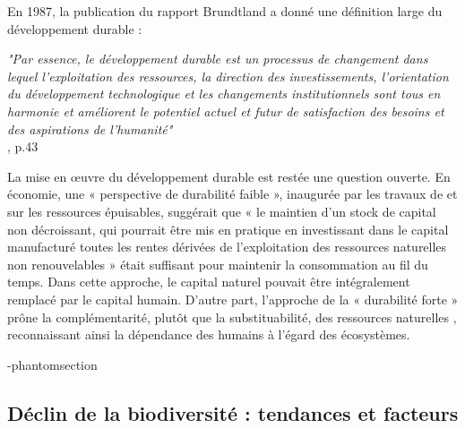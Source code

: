 \begin{displayquote}
\begin{displayquote}
\begin{displayquote}
\begin{tcolorbox}[breakable, 
colback=verylightgray, 
colframe=gray!75!black, 
title= {Box 1 - Soutenabilité Faible et Forte},
fontupper=\small]
En 1987, la publication du rapport Brundtland \citep{brundtland} a donné une définition large du développement durable : 

\begin{displayquote}
\textit{"Par essence, le développement durable est un processus de changement dans lequel l'exploitation des
ressources, la direction des investissements, l'orientation du développement technologique et les changements institutionnels sont tous en harmonie et améliorent le potentiel actuel et futur de satisfaction des besoins et des aspirations de l'humanité"}\\
\hspace*{\fill}\small{\cite{brundtland}, p.43}
\end{displayquote}

La mise en œuvre du développement durable est restée une question ouverte. En économie, une « perspective de durabilité faible », inaugurée par les travaux de \cite{hartwick_intergenerational_1977} et \cite{solow_intergenerational_1986} sur les ressources épuisables, suggérait que « le maintien d'un stock de capital non décroissant, qui pourrait être mis en pratique en investissant dans le capital manufacturé toutes les rentes dérivées de l'exploitation des ressources naturelles non renouvelables » \citep{gomez_history_2010} était suffisant pour maintenir la consommation au fil du temps. Dans cette approche, le capital naturel pouvait être intégralement remplacé par le capital humain. D'autre part, l'approche de la « durabilité forte » prône la complémentarité, plutôt que la substituabilité, des ressources naturelles \citep{costanza_daly}, reconnaissant ainsi la dépendance des humains à l'égard des écosystèmes.

\end{tcolorbox}

\N-phantomsection
\subsection*{Déclin de la biodiversité : tendances et facteurs}


\end{displayquote}
\end{displayquote}
\end{displayquote}

